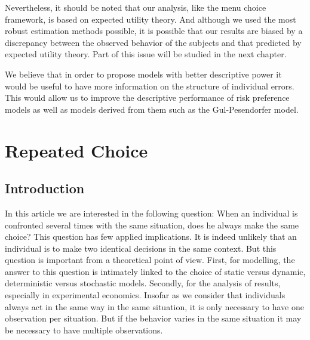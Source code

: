 \documentclass[
]{book}
\begin{document}
Nevertheless, it should be noted that our analysis, like the menu choice
framework, is based on expected utility theory.
And although we used the most robust estimation methods possible, it is possible
that our results are biased by a discrepancy between the observed behavior of
the subjects and that predicted by expected utility theory.
Part of this issue will be studied in the next chapter.

We believe that in order to propose models with better descriptive power it
would be useful to have more information on the structure of individual errors.
This would allow us to improve the descriptive performance of risk preference
models as well as models derived from them such as the Gul-Pesendorfer model.

\hypertarget{multi-choice}{%
\chapter{Repeated Choice}\label{multi-choice}}

\hypertarget{intro4}{%
\section{Introduction}\label{intro4}}

In this article we are interested in the following question: When an
individual is confronted several times with the same situation, does he
always make the same choice? This question has few applied
implications. It is indeed unlikely that an individual is to make two
identical decisions in the same context. But this question is
important from a theoretical point of view. First, for modelling, the
answer to this question is intimately linked to the choice of
static versus dynamic, deterministic versus stochastic models.
Secondly, for the analysis of results, especially in experimental
economics. Insofar as we consider that individuals always act in the
same way in the same situation, it is only necessary to have one
observation per situation. But if the behavior varies in the same
situation it may be necessary to have multiple observations.
\end{document}
